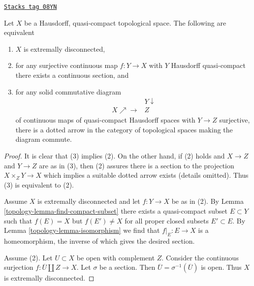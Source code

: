 \begin{proposition}
\label{topology-proposition-projective-in-category-hausdorff-qc}
\href{https://stacks.math.columbia.edu/tag/08YN}{\texttt{Stacks tag 08YN}}

Let $X$ be a Hausdorff, quasi-compact topological space.
The following are equivalent
\begin{enumerate}
\item $X$ is extremally disconnected,
\item for any surjective continuous map $f : Y \to X$ with $Y$ Hausdorff
quasi-compact there exists a continuous section, and
\item for any solid commutative diagram
$$
\begin{array}{cc} & Y \downarrow \\ X \nearrow\longrightarrow & Z\end{array}
$$
of continuous maps of quasi-compact Hausdorff spaces with $Y \to Z$
surjective, there is a dotted arrow
in the category of topological spaces making the diagram commute.
\end{enumerate}
\end{proposition}

\begin{proof}

It is clear that (3) implies (2). On the other hand, if (2) holds
and $X \to Z$ and $Y \to Z$ are as in (3), then (2) assures there
is a section to the projection $X \times_Z Y \to X$ which implies
a suitable dotted arrow exists (details omitted). Thus (3)
is equivalent to (2).

\medskip\noindent
Assume $X$ is extremally disconnected and let $f : Y \to X$ be as in (2).
By Lemma \ref{topology-lemma-find-compact-subset} there exists a quasi-compact subset
$E \subset Y$ such that $f(E) = X$ but $f(E') \not = X$ for all
proper closed subsets $E' \subset E$. By
Lemma \ref{topology-lemma-isomorphism} we find that $f|_E : E \to X$
is a homeomorphism, the inverse of which gives the desired section.

\medskip\noindent
Assume (2). Let $U \subset X$ be open with complement $Z$.
Consider the continuous surjection $f : \overline{U} \amalg Z \to X$.
Let $\sigma$ be a section. Then $\overline{U} = \sigma^{-1}(\overline{U})$
is open. Thus $X$ is extremally disconnected.
\end{proof}

